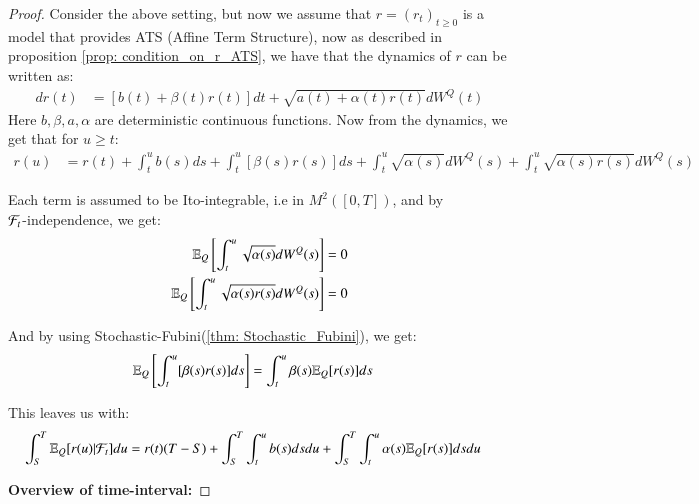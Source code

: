 \begin{proof}
Consider the above setting, but now we assume that $r = (r_{t})_{t\geq 0}$ is a model that provides ATS (Affine Term Structure), now as described in proposition \ref{prop: condition_on_r_ATS}, we have that the dynamics of $r$ can be written as: 
\begin{align*}
dr(t) &= [b(t) + \beta(t)r(t)]dt + \sqrt{a(t) + \alpha(t)r(t)}dW^{Q}(t)
\end{align*}
Here $b, \beta, a, \alpha$ are deterministic continuous functions. Now from the dynamics, we get that for $u\geq t$: 
\begin{align*}
r(u) &= r(t) + \int_{t}^{u}b(s)ds + \int_{t}^{u}[\beta(s)r(s)]ds
+ \int_{t}^{u}\sqrt{\alpha(s)}dW^{Q}(s)
+ \int_{t}^{u}\sqrt{\alpha(s)r(s)}dW^{Q}(s)
\end{align*}

Each term is assumed to be Ito-integrable, i.e in $M^{2}([0,T])$, and by \\ $\mathcal{F}_{t}$-independence, we get:
\begin{align*}
\mathbb{E}_{Q}\left[
\int_{t}^{u}\sqrt{\alpha(s)}dW^{Q}(s)
\right]
&= 0 \\ 
\mathbb{E}_{Q}\left[
\int_{t}^{u}\sqrt{\alpha(s)r(s)}dW^{Q}(s)
\right] 
&= 0
\end{align*} 

And by using Stochastic-Fubini(\ref{thm: Stochastic_Fubini}), we get:
\begin{align*}
\mathbb{E}_{Q}\left[
\int_{t}^{u}[\beta(s)r(s)]ds
\right]
&= 
\int_{t}^{u}\beta(s)\mathbb{E}_{Q}[r(s)]ds
\end{align*}

This leaves us with: 
\begin{align*}
\int_{S}^{T}\mathbb{E}_{Q}[r(u)|\mathcal{F}_{t}]du 
&= r(t)(T-S)
+ \int_{S}^{T}\int_{t}^{u}b(s)dsdu 
+ \int_{S}^{T}\int_{t}^{u}\alpha(s)\mathbb{E}_{Q}[r(s)]dsdu
\end{align*}


\textbf{Overview of time-interval:}


  

\end{proof}
